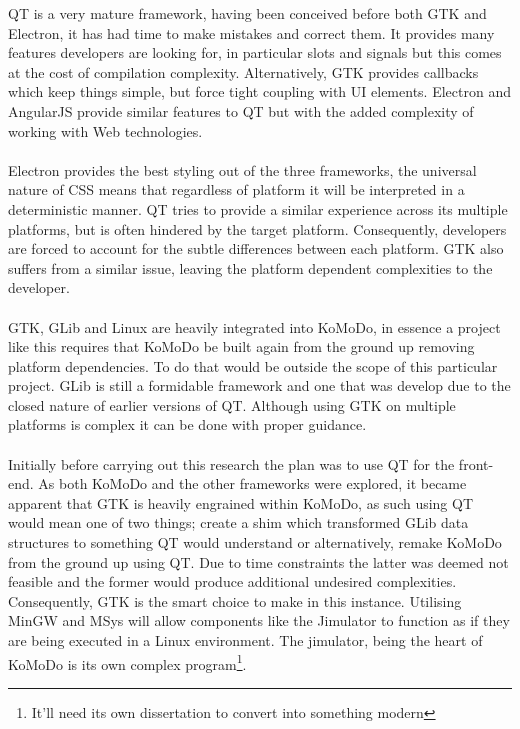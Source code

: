 QT is a very mature framework, having been conceived before both GTK and Electron, it has had time to make mistakes and correct them. It provides many features developers are looking for, in particular slots and signals but this comes at the cost of compilation complexity. Alternatively, GTK provides callbacks which keep things simple, but force tight coupling with UI elements. Electron and AngularJS provide similar features to QT but with the added complexity of working with Web technologies.\\\\
%
Electron provides the best styling out of the three frameworks, the universal nature of CSS means that regardless of platform it will be interpreted in a deterministic manner. QT tries to provide a similar experience across its multiple platforms, but is often hindered by the target platform. Consequently, developers are forced to account for the subtle differences between each platform. GTK also suffers from a similar issue, leaving the platform dependent complexities to the developer.\\\\
%
GTK, GLib and Linux are heavily integrated into KoMoDo, in essence a project like this requires that KoMoDo be built again from the ground up removing platform dependencies. To do that would be outside the scope of this particular project. GLib is still a formidable framework and one that was develop due to the closed nature of earlier versions of QT. Although using GTK on multiple platforms is complex it can be done with proper guidance.\\\\
%
Initially before carrying out this research the plan was to use QT for the front-end. As both KoMoDo and the other frameworks were explored, it became apparent that GTK is heavily engrained within KoMoDo, as such using QT would mean one of two things; create a shim which transformed GLib data structures to something QT would understand or alternatively, remake KoMoDo from the ground up using QT. Due to time constraints the latter was deemed not feasible and the former would produce additional undesired complexities. Consequently, GTK is the smart choice to make in this instance. Utilising MinGW and MSys will allow components like the Jimulator to function as if they are being executed in a Linux environment. The jimulator, being the heart of KoMoDo is its own complex program\footnote{It'll need its own dissertation to convert into something modern}.

